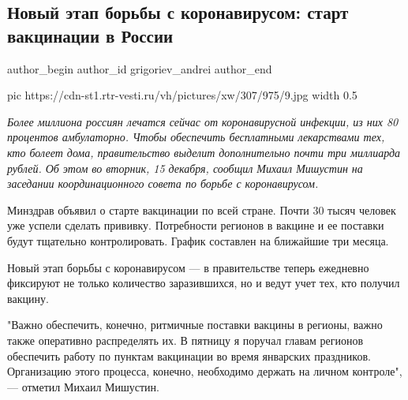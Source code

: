  
 
 
 
 
 
\subsection{Новый этап борьбы с коронавирусом: старт вакцинации в России}
\label{sec:15_12_2020.news.ru.vesti.grigoriev_andrei.1.vaccination_russia}
\ifcmt
	author_begin
   author_id grigoriev_andrei
	author_end
\fi


\ifcmt
  pic https://cdn-st1.rtr-vesti.ru/vh/pictures/xw/307/975/9.jpg
  width 0.5
\fi

\begin{leftbar}
	\begingroup
		\em Более миллиона россиян лечатся сейчас от коронавирусной инфекции, из них 80
процентов амбулаторно. Чтобы обеспечить бесплатными лекарствами тех, кто болеет
дома, правительство выделит дополнительно почти три миллиарда рублей.
Об этом во вторник, 15 декабря, сообщил Михаил Мишустин на заседании
координационного совета по борьбе с коронавирусом.

Минздрав объявил о старте вакцинации по всей стране. Почти 30 тысяч человек уже
успели сделать прививку. Потребности регионов в вакцине и ее поставки
будут тщательно контролировать. График составлен на ближайшие три
месяца.
	\endgroup
\end{leftbar}

Новый этап борьбы с коронавирусом — в правительстве теперь ежедневно фиксируют
не только количество заразившихся, но и ведут учет тех, кто получил вакцину.

"Важно обеспечить, конечно, ритмичные поставки вакцины в регионы, важно
также оперативно распределять их. В пятницу я поручал главам регионов
обеспечить работу по пунктам вакцинации во время январских праздников.
Организацию этого процесса, конечно, необходимо держать на личном
контроле", — отметил Михаил Мишустин.

